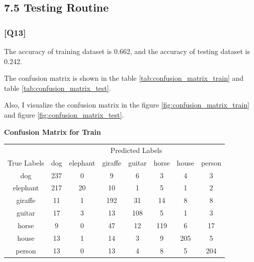 \documentclass{article}
\begin{document}
\subsection*{7.5 Testing Routine}

\subsubsection*{[Q13]}

The accuracy of training dataset is 0.662, and the accuracy of testing dataset is 0.242.

The confusion matrix is shown in the table \ref{tab:confusion_matrix_train} and table \ref{tab:confusion_matrix_test}.

Also, I visualize the confusion matrix in the figure \ref{fig:confusion_matrix_train} and figure \ref{fig:confusion_matrix_test}.

\begin{center}
    \textbf{Confusion Matrix for Train}
    
    \begin{tabular}{cccccccc}
    \toprule
    & \multicolumn{7}{c}{Predicted Labels} \\
    \cmidrule(lr){2-8}
    True Labels & dog & elephant & giraffe & guitar & horse & house & person \\
    \midrule
    dog & 237 & 0 & 9 & 6 & 3 & 4 & 3 \\
    elephant & 217 & 20 & 10 & 1 & 5 & 1 & 2 \\
    giraffe & 11 & 1 & 192 & 31 & 14 & 8 & 8 \\
    guitar & 17 & 3 & 13 & 108 & 5 & 1 & 3 \\
    horse & 9 & 0 & 47 & 12 & 119 & 6 & 17 \\
    house & 13 & 1 & 14 & 3 & 9 & 205 & 5 \\
    person & 13 & 0 & 13 & 4 & 8 & 5 & 204 \\
    \bottomrule
    \end{tabular}
    \label{tab:confusion_matrix_train}
    \end{center}
    
\end{document}
